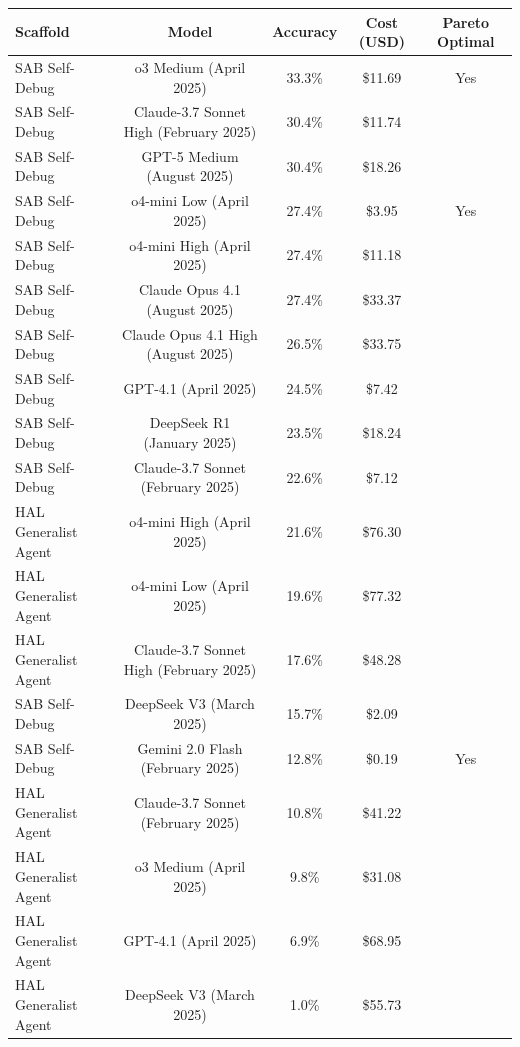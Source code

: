 \begin{tabular}{lcccc}
\toprule
Scaffold & Model & Accuracy & Cost (USD) & Pareto Optimal \\
\midrule
SAB Self-Debug & o3 Medium (April 2025) & 33.3\% & \$11.69 & Yes \\
SAB Self-Debug & Claude-3.7 Sonnet High (February 2025) & 30.4\% & \$11.74 &  \\
SAB Self-Debug & GPT-5 Medium (August 2025) & 30.4\% & \$18.26 &  \\
SAB Self-Debug & o4-mini Low (April 2025) & 27.4\% & \$3.95 & Yes \\
SAB Self-Debug & o4-mini High (April 2025) & 27.4\% & \$11.18 &  \\
SAB Self-Debug & Claude Opus 4.1 (August 2025) & 27.4\% & \$33.37 &  \\
SAB Self-Debug & Claude Opus 4.1 High (August 2025) & 26.5\% & \$33.75 &  \\
SAB Self-Debug & GPT-4.1 (April 2025) & 24.5\% & \$7.42 &  \\
SAB Self-Debug & DeepSeek R1 (January 2025) & 23.5\% & \$18.24 &  \\
SAB Self-Debug & Claude-3.7 Sonnet (February 2025) & 22.6\% & \$7.12 &  \\
HAL Generalist Agent & o4-mini High (April 2025) & 21.6\% & \$76.30 &  \\
HAL Generalist Agent & o4-mini Low (April 2025) & 19.6\% & \$77.32 &  \\
HAL Generalist Agent & Claude-3.7 Sonnet High (February 2025) & 17.6\% & \$48.28 &  \\
SAB Self-Debug & DeepSeek V3 (March 2025) & 15.7\% & \$2.09 &  \\
SAB Self-Debug & Gemini 2.0 Flash (February 2025) & 12.8\% & \$0.19 & Yes \\
HAL Generalist Agent & Claude-3.7 Sonnet (February 2025) & 10.8\% & \$41.22 &  \\
HAL Generalist Agent & o3 Medium (April 2025) & 9.8\% & \$31.08 &  \\
HAL Generalist Agent & GPT-4.1 (April 2025) & 6.9\% & \$68.95 &  \\
HAL Generalist Agent & DeepSeek V3 (March 2025) & 1.0\% & \$55.73 &  \\
\bottomrule
\end{tabular}